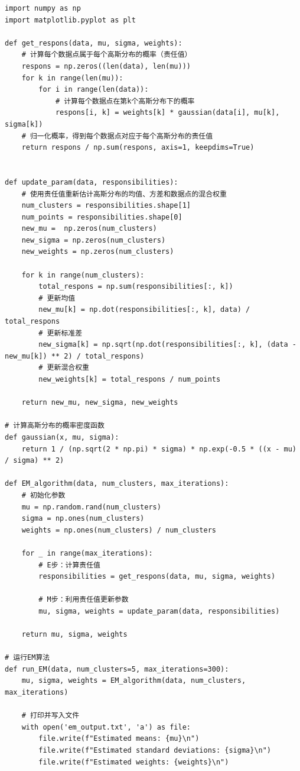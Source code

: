 \documentclass{article} %
\begin{document}
\begin{lstlisting}
import numpy as np
import matplotlib.pyplot as plt

def get_respons(data, mu, sigma, weights):
    # 计算每个数据点属于每个高斯分布的概率（责任值）
    respons = np.zeros((len(data), len(mu)))
    for k in range(len(mu)):
        for i in range(len(data)):
            # 计算每个数据点在第k个高斯分布下的概率
            respons[i, k] = weights[k] * gaussian(data[i], mu[k], sigma[k]) 
    # 归一化概率，得到每个数据点对应于每个高斯分布的责任值
    return respons / np.sum(respons, axis=1, keepdims=True)


def update_param(data, responsibilities):
    # 使用责任值重新估计高斯分布的均值、方差和数据点的混合权重
    num_clusters = responsibilities.shape[1]
    num_points = responsibilities.shape[0]
    new_mu =  np.zeros(num_clusters)
    new_sigma = np.zeros(num_clusters)
    new_weights = np.zeros(num_clusters)

    for k in range(num_clusters):
        total_respons = np.sum(responsibilities[:, k])
        # 更新均值
        new_mu[k] = np.dot(responsibilities[:, k], data) / total_respons
        # 更新标准差
        new_sigma[k] = np.sqrt(np.dot(responsibilities[:, k], (data - new_mu[k]) ** 2) / total_respons)
        # 更新混合权重
        new_weights[k] = total_respons / num_points

    return new_mu, new_sigma, new_weights

# 计算高斯分布的概率密度函数
def gaussian(x, mu, sigma):
    return 1 / (np.sqrt(2 * np.pi) * sigma) * np.exp(-0.5 * ((x - mu) / sigma) ** 2)

def EM_algorithm(data, num_clusters, max_iterations):
    # 初始化参数
    mu = np.random.rand(num_clusters)
    sigma = np.ones(num_clusters)
    weights = np.ones(num_clusters) / num_clusters

    for _ in range(max_iterations):
        # E步：计算责任值
        responsibilities = get_respons(data, mu, sigma, weights)

        # M步：利用责任值更新参数
        mu, sigma, weights = update_param(data, responsibilities)

    return mu, sigma, weights

# 运行EM算法
def run_EM(data, num_clusters=5, max_iterations=300):
    mu, sigma, weights = EM_algorithm(data, num_clusters, max_iterations)

    # 打印并写入文件
    with open('em_output.txt', 'a') as file:
        file.write(f"Estimated means: {mu}\n")
        file.write(f"Estimated standard deviations: {sigma}\n")
        file.write(f"Estimated weights: {weights}\n")


\end{lstlisting}
\end{document}
